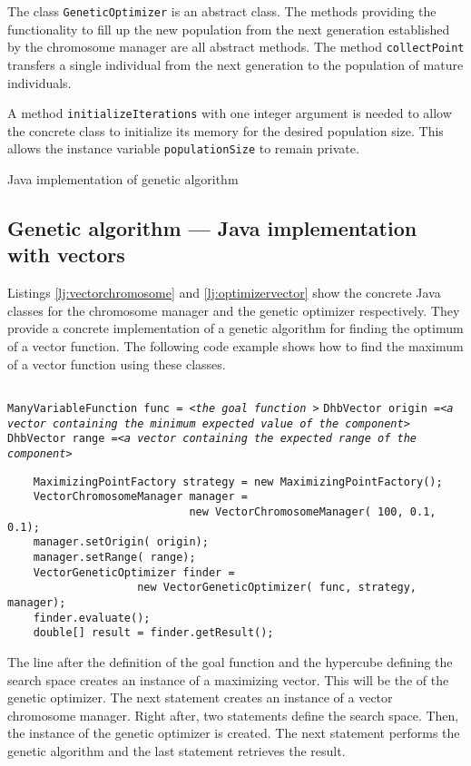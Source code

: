 \documentclass[twoside]{book}
\begin{document}
The class {\tt GeneticOptimizer} is an abstract class. The methods
providing the functionality to fill up the new population from the
next generation established by the chromosome manager are all
abstract methods. The method {\tt collectPoint} transfers a single
individual from the next generation to the population of mature
individuals.

A method {\tt initializeIterations} with one integer argument is
needed to allow the concrete class to initialize its memory for
the desired population size. This allows the instance variable
{\tt populationSize} to remain private.

\begin{listing} Java implementation of genetic algorithm
\label{lj:optimizerabsgen}

\end{listing}

\subsection{Genetic algorithm --- Java implementation with vectors}
 Listings \ref{lj:vectorchromosome} and
\ref{lj:optimizervector} show the concrete Java classes for the
chromosome manager and the genetic optimizer respectively. They
provide a concrete implementation of a genetic algorithm for
finding the optimum of a vector function. The following code
example shows how to find the maximum of a vector function using
these classes.
\begin{codeExample}
\begin{verbatim}
\end{verbatim}
{\tt ManyVariableFunction func = <\sl the goal function\tt
>}\hfil\break
 {\tt DhbVector origin =<\sl a vector containing the minimum expected value of the component\tt >}\hfil\break
 {\tt DhbVector range =<\sl a vector containing the expected range of the component\tt >}\hfil\break
\begin{verbatim}
    MaximizingPointFactory strategy = new MaximizingPointFactory();
    VectorChromosomeManager manager =
                            new VectorChromosomeManager( 100, 0.1, 0.1);
    manager.setOrigin( origin);
    manager.setRange( range);
    VectorGeneticOptimizer finder =
                    new VectorGeneticOptimizer( func, strategy, manager);
    finder.evaluate();
    double[] result = finder.getResult();
\end{verbatim}
\end{codeExample}
The line after the definition of the goal function and the
hypercube defining the search space creates an instance of a
maximizing vector. This will be the  of the
genetic optimizer. The next statement creates an instance of a
vector chromosome manager. Right after, two statements define the
search space. Then, the instance of the genetic optimizer is
created. The next statement performs the genetic algorithm and the
last statement retrieves the result.
\end{document}
